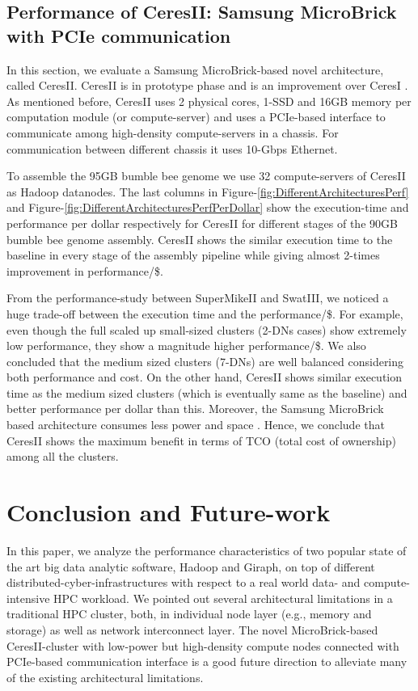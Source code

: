 \documentclass[conference]{IEEEtran}
\begin{document}
\subsection {Performance of CeresII: Samsung MicroBrick with PCIe communication} \label{CeresII:Scaledout-in-a-boxAndSSD}
In this section, we evaluate a Samsung MicroBrick-based novel architecture, called CeresII. CeresII is in prototype phase and is an improvement over CeresI \cite{Cluster:ceres1}. As mentioned before, CeresII uses 2 physical cores, 1-SSD and 16GB memory per computation module (or compute-server) and uses a PCIe-based interface to communicate among high-density compute-servers in a chassis. For communication between different chassis it uses 10-Gbps Ethernet.

To assemble the 95GB bumble bee genome we use 32 compute-servers of CeresII as Hadoop datanodes. The last columns in Figure-\ref{fig:DifferentArchitecturesPerf} and Figure-\ref{fig:DifferentArchitecturesPerfPerDollar} show the execution-time and performance per dollar respectively for CeresII for different stages of the 90GB bumble bee genome assembly. CeresII shows the similar execution time to the baseline in every stage of the assembly pipeline while giving almost 2-times improvement in performance/\$.

From the performance-study between SuperMikeII and SwatIII, we noticed a huge trade-off between the execution time and the performance/\$. For example, even though the full scaled up small-sized clusters (2-DNs cases) show extremely low performance, they show a magnitude higher performance/\$. We also concluded that the medium sized clusters (7-DNs) are well balanced considering both performance and cost. On the other hand, CeresII shows similar execution time as the medium sized clusters (which is eventually same as the baseline) and better performance per dollar than this. Moreover, the Samsung MicroBrick based architecture consumes less power and space \cite{Cluster:ceres1}. Hence, we conclude that CeresII shows the maximum benefit in terms of TCO (total cost of ownership) among all the clusters.

\section {Conclusion and Future-work} \label{conclusion}
In this paper, we analyze the performance characteristics of two popular state of the art big data analytic software, Hadoop and Giraph, on top of different distributed-cyber-infrastructures with respect to a real world data- and compute-intensive HPC workload. We pointed out several architectural limitations in a traditional HPC cluster, both, in individual node layer (e.g., memory and storage) as well as network interconnect layer. The novel MicroBrick-based CeresII-cluster with low-power but high-density compute nodes connected with PCIe-based communication interface is a good future direction to alleviate many of the existing architectural limitations.
\end{document}
